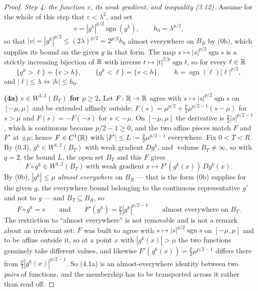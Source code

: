 \begin{proof}
\emph{Step 4: the function $v$, its weak gradient, and inequality
\textup{(3.12)}.}  Assume for the whole of this step that
$\varepsilon<\lambda^2$, and set
\[
v=|g^k|^{p/2}\operatorname{sgn}(g^k),\qquad h_0=\lambda^{p/2},
\]
so that $|v|=|g^k|^{p/2}\le(2\lambda)^{p/2}=2^{p/2}h_0$ almost everywhere on
$B_R$ by (0b), which supplies its bound on the given $g$ in that form.  The
map $s\mapsto|s|^{p/2}\operatorname{sgn}s$ is a strictly increasing bijection of
$\mathbb{R}$ with inverse $t\mapsto|t|^{2/p}\operatorname{sgn}t$, so for every
$\ell\in\mathbb{R}$
\[
\{g^k>\ell\}=\{v>h\},\qquad
\{g^k<\ell\}=\{v<h\},\qquad
h=\operatorname{sgn}(\ell)|\ell|^{p/2} ,
\tag{4.1}
\]
and $|\ell|\le\lambda\iff|h|\le h_0$.

\textbf{(4a) $v\in W^{1,2}(B_T)$ for $p\ge2$.}  Let $F\colon\mathbb{R}\to\mathbb{R}$ agree with
$s\mapsto|s|^{p/2}\operatorname{sgn}s$ on $[-\mu,\mu]$ and be extended affinely
outside: $F(s)=\mu^{p/2}+\tfrac p2\mu^{p/2-1}(s-\mu)$ for $s>\mu$ and
$F(s)=-F(-s)$ for $s<-\mu$.  On $[-\mu,\mu]$ the derivative is
$\tfrac p2|s|^{p/2-1}$, which is continuous because $p/2-1\ge0$, and the two
affine pieces match $F$ and $F'$ at $\pm\mu$; hence $F\in C^1(\mathbb{R})$ with
$|F'|\le L:=\tfrac p2\mu^{p/2-1}$ everywhere.  Fix $0<T<R$.  By (0.3),
$g^k\in W^{1,2}(B_T)$ with weak gradient $Dg^k$, and
$\operatorname{volume}B_T\ne\infty$, so  with
$q=2$, the bound $L$, the open set $B_T$ and this $F$ gives
\[
F\circ g^k\in W^{1,2}(B_T)\ \text{with weak gradient}\ x\mapsto F'(g^k(x))\,Dg^k(x).
\]
By (0b), $|g^k|\le\mu$ \emph{almost everywhere} on $B_R$ --- that is the form
(0b) supplies for the given $g$, the everywhere bound belonging to the
continuous representative $g'$ and not to $g$ --- and $B_T\subseteq B_R$, so
\[
F\circ g^k=v
\qquad\text{and}\qquad
F'(g^k)=\tfrac p2|g^k|^{p/2-1}
\qquad\text{almost everywhere on }B_T .
\tag{4.1a}
\]
The restriction to ``almost everywhere'' is not removable and is not a remark
about an irrelevant set: $F$ was built to agree with
$s\mapsto|s|^{p/2}\operatorname{sgn}s$ on $[-\mu,\mu]$ and to be affine outside
it, so at a point $x$ with $|g^k(x)|>\mu$ the two functions genuinely take
different values, and likewise $F'(g^k(x))=\tfrac p2\mu^{p/2-1}$ differs there
from $\tfrac p2|g^k(x)|^{p/2-1}$.  So (4.1a) is an almost-everywhere identity
between two \emph{pairs} of functions, and the membership has to be transported
across it rather than read off.


\end{proof}
